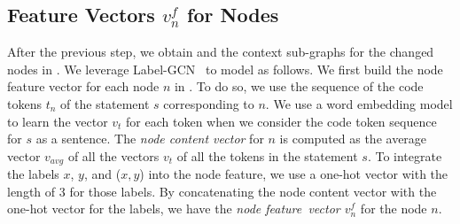 \subsection{Feature Vectors $v^{f}_n$ for {\mvpdgxy} Nodes}
\label{feature:sec}

After the previous step, we obtain {\mvpdgxy} and the context
sub-graphs for the changed nodes in {\mvpdgxy}. We leverage
Label-GCN~\cite{label-gcn} to model {\mvpdgxy} as follows. We first
build the node feature vector for each node $n$ in {\mvpdgxy}. To do
so, we use the sequence of the code tokens $t_n$ of the statement $s$
corresponding to $n$. We use a word embedding
model to learn the vector $v_t$ for each token when we consider the
code token sequence for $s$ as a sentence. The {\em node content
  vector} for $n$ is computed as the average vector $v_{avg}$ of
all the vectors $v_t$ of all the tokens in the statement $s$.
%
To integrate the labels $x$, $y$, and ($x,y$) into the node feature,
we use a one-hot vector with the length of 3 for those labels. By
concatenating the node content vector with the one-hot vector for the
labels, we have the {\em node feature~vector $v^{f}_n$} for the node
$n$. 




